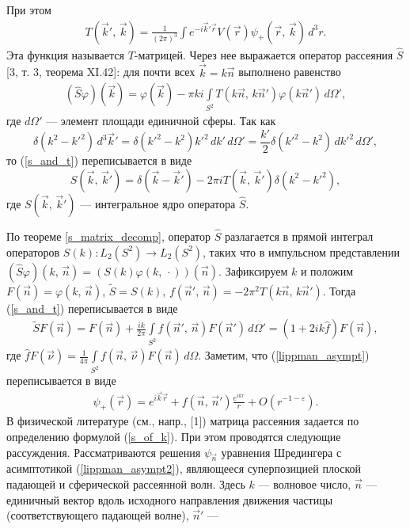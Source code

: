 \documentclass[a4paper
]{article}
\begin{document}
При этом
\begin{align}
\label{t_matrix}
T(\vec k', \, \vec k)=\frac{1}{(2\pi)^3}\int
e^{-i\vec k'\vec r}V(\vec r)\psi_+(\vec r, \, \vec k)\, d^3r.
\end{align}
Эта функция называется $T$-матрицей. Через нее выражается оператор
рассеяния $\hat S$ [3, т. 3, теорема XI.42]: для почти всех
$\vec k=k\vec n$ выполнено равенство
\begin{align}
\label{s_and_t}
(\hat S\varphi)(\vec k)=\varphi(\vec k)-\pi ki\int \limits_{S^2}T(k\vec n,
\, k\vec n')\varphi(k\vec n')\, d\Omega',
\end{align}
где $d\Omega'$ --- элемент площади единичной сферы. Так как $$\delta
(k^2-k'^2)\, d^3\vec k'=\delta(k'^2-k^2)k'^2\, dk'\, d\Omega'=
\frac{k'}{2}\delta(k'^2-k^2)\, dk'^2\, d\Omega',$$ то (\ref{s_and_t})
переписывается в виде $$S(\vec k, \, \vec k')=\delta(\vec k-\vec k')
-2\pi iT(\vec k, \, \vec k')\delta(k^2-k'^2),$$ где $S(\vec k, \, \vec k')$
--- интегральное ядро оператора $\hat S$. \par
По теореме \ref{s_matrix_decomp}, оператор $\hat S$ разлагается в
прямой интеграл операторов $S(k):L_2(S^2)\rightarrow L_2(S^2)$,
таких что в импульсном представлении $(\hat S\varphi)(k, \, \vec n)=
(S(k)\varphi(k, \, \cdot))(\vec n)$. Зафиксируем $k$ и положим
$F(\vec n)=\varphi(k, \, \vec n)$, $\tilde S=S(k)$, $f(\vec n', \,
\vec n)=-2\pi^2 T(k\vec n, \, k\vec n')$. Тогда (\ref{s_and_t})
переписывается в виде
\begin{align}
\label{s_of_k}
\tilde SF(\vec n)=F(\vec n)+\frac{ik}{2\pi}\int \limits_{S^2}f(\vec n', \, \vec n)
F(\vec n')\, d\Omega'=(1+2ik\hat f)F(\vec n),
\end{align}
где $\hat fF(\vec \nu)=\frac{1}{4\pi}
\int \limits_{S^2}f(\vec n, \, \vec \nu)F(\vec n)\, d\Omega$. Заметим,
что (\ref{lippman_asympt}) переписывается в виде
\begin{align}
\label{lippman_asympt2}
\psi_+(\vec r)=e^{i\vec k\vec r}+f(\vec n, \, \vec n')\frac{e^{ikr}}{r}
+O(r^{-1-\varepsilon}).
\end{align}
В физической литературе (см., напр., [1]) матрица рассеяния задается
по определению формулой (\ref{s_of_k}). При этом проводятся следующие
рассуждения. Рассматриваются решения $\psi_{\vec n}$ уравнения Шредингера
с асимптотикой (\ref{lippman_asympt2}), являющееся суперпозицией
плоской падающей и сферической рассеянной волн. Здесь $k$ --- волновое
число, $\vec n$ --- единичный вектор вдоль исходного направления
движения частицы (соответствующего падающей волне), $\vec n'$ ---
\end{document}
